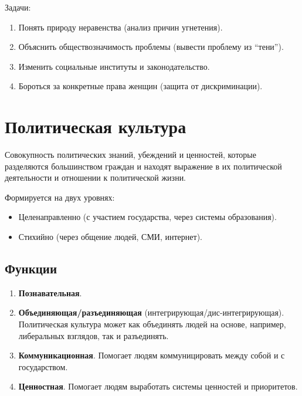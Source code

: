 \documentclass[12pt]{article}
\begin{document}
	\begin{note}
		Задачи:
		\begin{enumerate}
			\item Понять природу неравенства (анализ причин угнетения).
			\item Объяснить обществозначимость проблемы (вывести проблему из ``тени'').
			\item Изменить социальные институты и законодательство.
			\item Бороться за конкретные права женщин (защита от дискриминации).
		\end{enumerate}
	\end{note}
	
	\section{Политическая культура}
	
	\begin{definition}
		Совокупность политических знаний, убеждений и ценностей, которые разделяются большинством граждан и находят выражение в их политической деятельности и отношении к политической жизни.
	\end{definition}
	
	\begin{note}
		Формируется на двух уровнях:
		\begin{itemize}
			\item Целенаправленно (с участием государства, через системы образования).
			\item Стихийно (через общение людей, СМИ, интернет).
		\end{itemize}
	\end{note}
	
	\subsection{Функции}
	\begin{enumerate}
		\item \textbf{Познавательная}.
		\item \textbf{Объединяющая/разъединяющая} (интегрирующая/дис-интегрирующая). Политическая культура может как объединять людей на основе, например, либеральных взглядов, так и разъединять.
		\item \textbf{Коммуникационная}. Помогает людям коммуницировать между собой и с государством.
		\item \textbf{Ценностная}. Помогает людям выработать системы ценностей и приоритетов.
	\end{enumerate}
	
\end{document}
